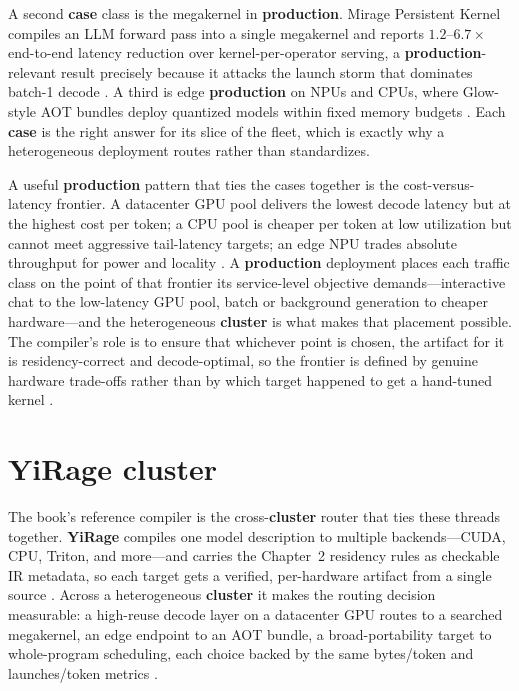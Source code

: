 A second \textbf{case} class is the megakernel in \textbf{production}. Mirage Persistent Kernel compiles an LLM forward pass into a single megakernel and reports $1.2$--$6.7\times$ end-to-end latency reduction over kernel-per-operator serving, a \textbf{production}-relevant result precisely because it attacks the launch storm that dominates batch-1 decode \citep{mpk2025,memoryfloor2026}. A third is edge \textbf{production} on NPUs and CPUs, where Glow-style AOT bundles deploy quantized models within fixed memory budgets \citep{rotem2018glow,amd2024aie}. Each \textbf{case} is the right answer for its slice of the fleet, which is exactly why a heterogeneous deployment routes rather than standardizes.

A useful \textbf{production} pattern that ties the cases together is the cost-versus-latency frontier. A datacenter GPU pool delivers the lowest decode latency but at the highest cost per token; a CPU pool is cheaper per token at low utilization but cannot meet aggressive tail-latency targets; an edge NPU trades absolute throughput for power and locality \citep{patel2025llminference,rotem2018glow}. A \textbf{production} deployment places each traffic class on the point of that frontier its service-level objective demands---interactive chat to the low-latency GPU pool, batch or background generation to cheaper hardware---and the heterogeneous \textbf{cluster} is what makes that placement possible. The compiler's role is to ensure that whichever point is chosen, the artifact for it is residency-correct and decode-optimal, so the frontier is defined by genuine hardware trade-offs rather than by which target happened to get a hand-tuned kernel \citep{yirage2026,memoryfloor2026}.

\section{YiRage cluster}
\label{sec:ch24_yirage_cluster}

The book's reference compiler is the cross-\textbf{cluster} router that ties these threads together. \textbf{YiRage} compiles one model description to multiple backends---CUDA, CPU, Triton, and more---and carries the Chapter~2 residency rules as checkable IR metadata, so each target gets a verified, per-hardware artifact from a single source \citep{yirage2026}. Across a heterogeneous \textbf{cluster} it makes the routing decision measurable: a high-reuse decode layer on a datacenter GPU routes to a searched megakernel, an edge endpoint to an AOT bundle, a broad-portability target to whole-program scheduling, each choice backed by the same bytes/token and launches/token metrics \citep{mpk2025,iree2024,rotem2018glow}.


